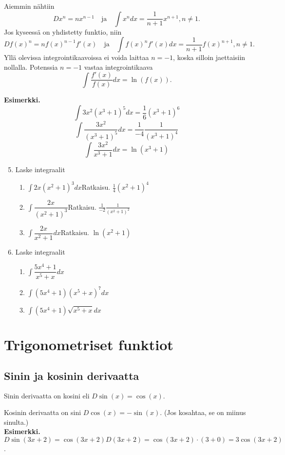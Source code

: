 \documentclass[10pt]{article}
\newcommand{\ratkaisu}[1]{\hfill{\color{blue}\quad\textrm{Ratkaisu. } #1}}
\begin{document}
Aiemmin nähtiin
$$
Dx^n=nx^{n-1}
\quad\textrm{ja}\quad
\int x^ndx=\frac{1}{n+1}x^{n+1}, n\neq 1.
$$
Jos kyseessä on yhdistetty funktio, niin
$$
D f(x)^n=nf(x)^{n-1}f'(x)
\quad\textrm{ja}\quad
\int f(x)^nf'(x)dx=\frac{1}{n+1}f(x)^{n+1}, n\neq 1.
$$
Yllä olevissa integrointikaavoissa ei voida laittaa $n=-1$, koska silloin jaettaisiin nollalla. Potenssia $n=-1$ vastaa integrointikaava
$$
\int\frac{f'(x)}{f(x)}dx=\ln(f(x)).
$$

\textbf{Esimerkki.}
$$
\int 3x^2(x^3+1)^5dx=\frac{1}{6}(x^3+1)^6
$$
$$
\int \frac{3x^2}{(x^3+1)^5}dx=\frac{1}{-4}\frac{1}{(x^3+1)^4}
$$
$$
\int \frac{3x^2}{x^3+1}dx=\ln(x^3+1)
$$


\begin{enumerate}
\setcounter{enumi}{4}
\item Laske integraalit
\begin{enumerate}
\item $\int 2x(x^2+1)^3dx$\ratkaisu{$\frac{1}{4}(x^2+1)^4$}
\item $\int\dfrac{2x}{(x^2+1)^3}$\ratkaisu{$\frac{1}{-2}\frac{1}{(x^2+1)^2}$}
\item $\int\dfrac{2x}{x^2+1}dx$\ratkaisu{$\ln(x^2+1)$}
\end{enumerate}
\item Laske integraalit
\begin{enumerate}
\item $\int\dfrac{5x^4+1}{x^5+x}dx$
\item $\int (5x^4+1)(x^5+x)^7dx$
\item $\int (5x^4+1)\sqrt{x^5+x}dx$
\end{enumerate}
\end{enumerate}

\newpage
\section{Trigonometriset funktiot}
\subsection{Sinin ja kosinin derivaatta}

Sinin derivaatta on kosini eli $D\sin(x)=\cos(x)$.

Kosinin derivaatta on sini $D\cos(x)=-\sin(x)$. (Jos kosahtaa, se on miinus sinulta.)\\[2mm]

\textbf{Esimerkki.} $D\sin(3x+2)=\cos(3x+2)D(3x+2)=\cos(3x+2)\cdot (3+0)=3\cos(3x+2)$.
\end{document}
